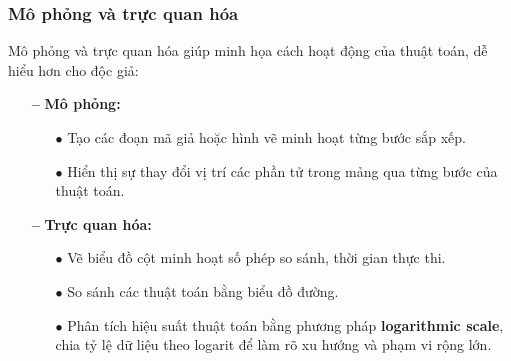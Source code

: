 \subsubsection{Mô phỏng và trực quan hóa}
Mô phỏng và trực quan hóa giúp minh họa cách hoạt động của thuật toán, dễ hiểu hơn cho độc giả:

\begin{itemize}
    \item [\textbf{--}]\textbf{Mô phỏng:}
    \begin{itemize}
        \item [$\bullet$]Tạo các đoạn mã giả hoặc hình vẽ minh hoạt từng bước sắp xếp.
        \item [$\bullet$]Hiển thị sự thay đổi vị trí các phần tử trong mảng qua từng bước của thuật toán.
    \end{itemize}
    \item [\textbf{--}]\textbf{Trực quan hóa:}
    \begin{itemize}
        \item [$\bullet$]Vẽ biểu đồ cột minh hoạt số phép so sánh, thời gian thực thi.
        \item [$\bullet$]So sánh các thuật toán bằng biểu đồ đường.
        \item [$\bullet$] Phân tích hiệu suất thuật toán bằng phương pháp \textbf{logarithmic scale}, chia tỷ lệ dữ liệu theo logarit để làm rõ xu hướng và phạm vi rộng lớn.\cite{ibm_logarithmic_scale}
    \end{itemize}
\end{itemize}
\newpage
